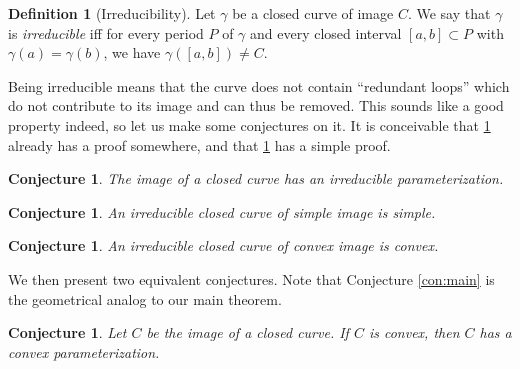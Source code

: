\documentclass{amsart}
\newtheorem{conjecture}[proposition]{Conjecture}
\theoremstyle{definition}
\newtheorem{definition}[proposition]{Definition}
\theoremstyle{remark}
\begin{document}
\begin{definition}[Irreducibility]
    Let $\gamma$ be a closed curve of image $C$.
    We say that $\gamma$ is \emph{irreducible} iff for every period
    $P$ of $\gamma$ and every closed interval $[a,b]\subset P$
    with $\gamma(a)=\gamma(b)$, we have
    $\gamma([a,b])\ne C$.
\end{definition}

Being irreducible means that the curve does not contain
``redundant loops'' which do not contribute to its image
and can thus be removed.
This sounds like a good property indeed,
so let us make some conjectures on it.
It is conceivable that
\ref{con:irr_exists} already has a proof somewhere,
and that \ref{con:irr_simple} has a simple proof.

\begin{conjecture}
    \label{con:irr_exists}
    The image of a closed curve has an irreducible parameterization.
\end{conjecture}

\begin{conjecture}
    \label{con:irr_simple}
    An irreducible closed curve of simple image is simple.
\end{conjecture}

\begin{conjecture}
    \label{con:irr_convex}
    An irreducible closed curve of convex image is convex.
\end{conjecture}


We then present two equivalent conjectures.
Note that Conjecture \ref{con:main} is the geometrical analog to
our main theorem.

\begin{conjecture}
    \label{con:convex}
    Let $C$ be the image of a closed curve. If $C$ is convex,
    then $C$ has a convex parameterization.
\end{conjecture}
\end{document}
